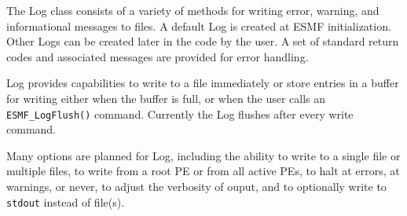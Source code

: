 



The Log class consists of a variety of methods for writing error, warning, 
and informational messages to files.  A default Log is 
created at ESMF initialization.  Other Logs can be created later in the code
by the user.  A set of standard return codes and associated messages are 
provided for error handling.  

Log provides capabilities to write to a file immediately or store entries 
in a buffer for writing either when the buffer is full, or when the user
calls an {\tt ESMF\_LogFlush()} command.  Currently the Log flushes after
every write command.

Many options are planned for Log, including the ability 
to write to a single file or multiple files, to write from a root PE or 
from all active PEs, to halt at errors, at warnings, or never, to 
adjust the verbosity of ouput, and to optionally write to {\tt stdout} 
instead of file(s).




